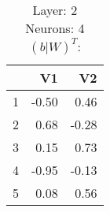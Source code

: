 \begin{table}[ht]
\centering
\begin{tabular}{rrr}
  \hline
 & V1 & V2 \\ 
  \hline
1 & -0.50 & 0.46 \\ 
  2 & 0.68 & -0.28 \\ 
  3 & 0.15 & 0.73 \\ 
  4 & -0.95 & -0.13 \\ 
  5 & 0.08 & 0.56 \\ 
   \hline
\end{tabular}
\caption{Layer: 2 Neurons: 4  $(b|W)^T$: 
} 
\end{table}
